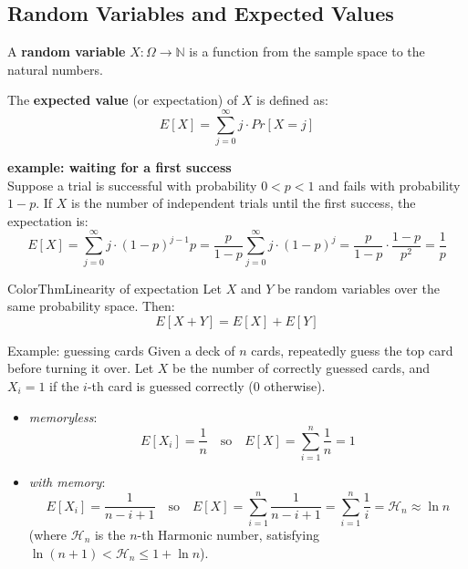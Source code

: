 \documentclass[a4paper, 11pt]{report}
\begin{document}
\subsection{Random Variables and Expected Values}

A \textbf{random variable} $X: \Omega \rightarrow \mathbb{N}$ is a function from the sample space to the natural numbers. 

The \textbf{expected value} (or expectation) of $X$ is defined as:
$$E[X] = \sum_{j=0}^\infty j \cdot Pr[X = j]$$

\textbf{example: waiting for a first success} \\
Suppose a trial is successful with probability $0 < p < 1$ and fails with probability $1 - p$. If $X$ is the number of independent trials until the first success, the expectation is:
$$E[X] = \sum_{j=0}^\infty j \cdot (1-p)^{j-1}p = \frac{p}{1-p} \sum_{j=0}^\infty j \cdot (1-p)^j = \frac{p}{1-p} \cdot \frac{1-p}{p^2} = \frac{1}{p}$$

\begin{cframe}{ColorThm}{Linearity of expectation}{}
    Let $X$ and $Y$ be random variables over the same probability space. Then:
    $$E[X + Y] = E[X] + E[Y]$$
\end{cframe}

\begin{gframe}{Example: guessing cards}
Given a deck of $n$ cards, repeatedly guess the top card before turning it over. Let $X$ be the number of correctly guessed cards, and $X_i = 1$ if the $i$-th card is guessed correctly (0 otherwise).
\begin{itemize}
    \item \textit{memoryless}: 
        $$E[X_i] = \frac{1}{n} \ \ \ \text{ so } \ \ \ E[X] = \sum_{i=1}^n \frac{1}{n} = 1$$
    \item \textit{with memory}: 
        $$E[X_i] = \frac{1}{n-i+1} \  \ \ \text{ so } \  \ \ E[X] = \sum_{i=1}^n \frac{1}{n-i+1} = \sum_{i=1}^n \frac{1}{i} = \mathcal{H}_n \approx \ln n$$ 
    (where $\mathcal{H}_n$ is the $n$-th Harmonic number, satisfying $\ln(n+1) < \mathcal{H}_n \le 1 + \ln n$).
\end{itemize}
\end{gframe}
\end{document}
